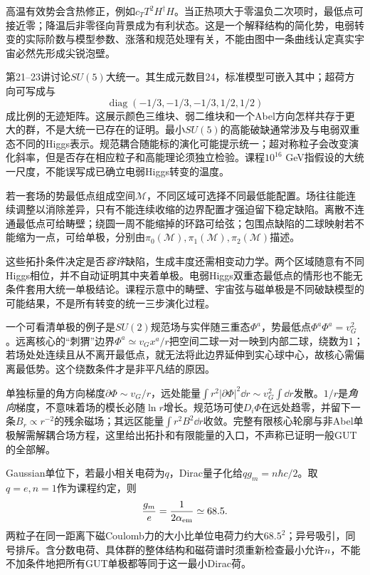 高温有效势会含热修正，例如$c_TT^2H^\dagger H$。当正热项大于零温负二次项时，最低点可接近零；降温后非零径向背景成为有利状态。这是一个解释结构的简化势，电弱转变的实际阶数与模型参数、涨落和规范处理有关，不能由图中一条曲线认定真实宇宙必然先形成尖锐泡壁。

第21--23讲讨论$SU(5)$大统一。其生成元数目24，标准模型可嵌入其中；超荷方向可写成与
\[
 \operatorname{diag}(-1/3,-1/3,-1/3,1/2,1/2)
\]
成比例的无迹矩阵。这展示颜色三维块、弱二维块和一个Abel方向怎样共存于更大的群，不是大统一已存在的证明。最小$SU(5)$的高能破缺通常涉及与电弱双重态不同的Higgs表示。规范耦合随能标的演化可能提示统一；超对称粒子会改变演化斜率，但是否存在相应粒子和高能理论须独立检验。课程$10^{16}$ GeV指假设的大统一尺度，不能误写成已确立电弱Higgs转变的温度。

若一套场的势最低点组成空间$\mathcal M$，不同区域可选择不同最低能配置。场往往能连续调整以消除差异，只有不能连续收缩的边界配置才强迫留下稳定缺陷。离散不连通最低点可给畴壁；绕圆一周不能缩掉的环路可给弦；包围点缺陷的二球映射若不能缩为一点，可给单极，分别由$\pi_0(\mathcal M),\pi_1(\mathcal M),\pi_2(\mathcal M)$描述。

这些拓扑条件决定是否\emph{容许}缺陷，生成丰度还需相变动力学。两个区域随意有不同Higgs相位，并不自动证明其中夹着单极。电弱Higgs双重态最低点的情形也不能无条件套用大统一单极结论。课程示意中的畴壁、宇宙弦与磁单极是不同破缺模型的可能结果，不是所有转变的统一三步演化过程。

一个可看清单极的例子是$SU(2)$规范场与实伴随三重态$\Phi^a$，势最低点$\Phi^a\Phi^a=v_G^2$。远离核心的“刺猬”边界$\Phi^a\simeq v_Gx^a/r$把空间二球一对一映到内部二球，绕数为1；若场处处连续且从不离开最低点，就无法将此边界延伸到实心球中心，故核心需偏离最低势。这个绕数条件才是非平凡结的原因。

单独标量的角方向梯度$\partial\Phi\sim v_G/r$，远处能量$\int r^2|\partial\Phi|^2\dd r\sim v_G^2\int\dd r$发散。$1/r$是\emph{角向}梯度，不意味着场的模长必随$\ln r$增长。规范场可使$D_i\Phi$在远处趋零，并留下一条$B_r\propto r^{-2}$的残余磁场；其远区能量$\int r^2B^2\dd r$收敛。完整有限核心轮廓与非Abel单极解需解耦合场方程，这里给出拓扑和有限能量的入口，不声称已证明一般GUT的全部解。

Gaussian单位下，若最小相关电荷为$q$，Dirac量子化给$qg_m=n\hbar c/2$。取$q=e,n=1$作为课程约定，则
\[
 \frac{g_m}{e}=\frac1{2\alpha_{\rm em}}\simeq68.5.
\]
两粒子在同一距离下磁Coulomb力的大小比单位电荷力约大$68.5^2$；异号吸引，同号排斥。含分数电荷、具体群的整体结构和磁荷谱时须重新检查最小允许$n$，不能不加条件地把所有GUT单极都等同于这一最小Dirac荷。

